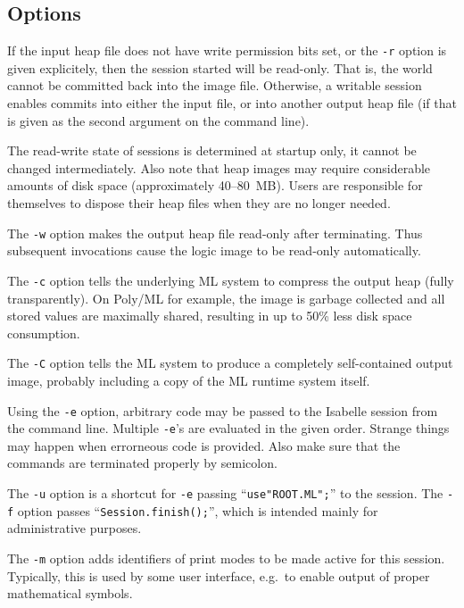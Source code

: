 \subsection*{Options}

If the input heap file does not have write permission bits set, or the
\texttt{-r} option is given explicitely, then the session started will be
read-only.  That is, the {\ML} world cannot be committed back into the image
file.  Otherwise, a writable session enables commits into either the input
file, or into another output heap file (if that is given as the second
argument on the command line).

The read-write state of sessions is determined at startup only, it cannot be
changed intermediately. Also note that heap images may require considerable
amounts of disk space (approximately 40--80~MB). Users are responsible for
themselves to dispose their heap files when they are no longer needed.

\medskip The \texttt{-w} option makes the output heap file read-only after
terminating.  Thus subsequent invocations cause the logic image to be
read-only automatically.

\medskip The \texttt{-c} option tells the underlying ML system to compress the
output heap (fully transparently).  On Poly/ML for example, the image is
garbage collected and all stored values are maximally shared, resulting in up
to 50\% less disk space consumption.

\medskip The \texttt{-C} option tells the ML system to produce a completely
self-contained output image, probably including a copy of the ML runtime
system itself.

\medskip Using the \texttt{-e} option, arbitrary {\ML} code may be passed to
the Isabelle session from the command line. Multiple \texttt{-e}'s are
evaluated in the given order. Strange things may happen when errorneous {\ML}
code is provided. Also make sure that the {\ML} commands are terminated
properly by semicolon.

\medskip The \texttt{-u} option is a shortcut for \texttt{-e} passing
``\texttt{use"ROOT.ML";}'' to the {\ML} session.  The \texttt{-f} option
passes ``\texttt{Session.finish();}'', which is intended mainly for
administrative purposes.

\medskip The \texttt{-m} option adds identifiers of print modes to be made
active for this session. Typically, this is used by some user interface, e.g.\ 
to enable output of proper mathematical symbols.


